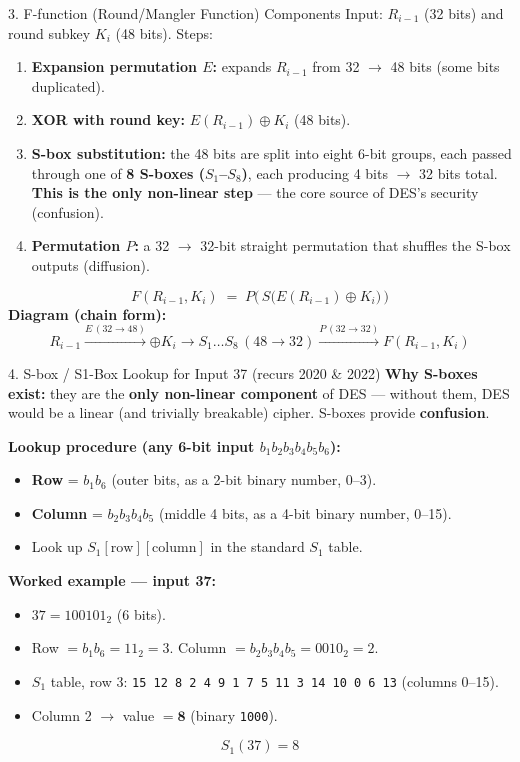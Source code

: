\documentclass[12pt,a4paper]{article}
\begin{document}
\begin{algobox}{3. F-function (Round/Mangler Function) Components}
Input: $R_{i-1}$ (32 bits) and round subkey $K_i$ (48 bits). Steps:
\begin{enumerate}[noitemsep]
  \item \textbf{Expansion permutation $E$:} expands $R_{i-1}$ from 32 $\to$ 48 bits (some bits duplicated).
  \item \textbf{XOR with round key:} $E(R_{i-1}) \oplus K_i$ (48 bits).
  \item \textbf{S-box substitution:} the 48 bits are split into eight 6-bit groups, each passed through one of \textbf{8 S-boxes ($S_1$--$S_8$)}, each producing 4 bits $\to$ 32 bits total. \textbf{This is the only non-linear step} --- the core source of DES's security (confusion).
  \item \textbf{Permutation $P$:} a 32 $\to$ 32-bit straight permutation that shuffles the S-box outputs (diffusion).
\end{enumerate}
\[
F(R_{i-1},K_i) \;=\; P\Big(\, S\big(E(R_{i-1}) \oplus K_i\big) \,\Big)
\]
\textbf{Diagram (chain form):}
\[
R_{i-1} \xrightarrow{E\,(32\to48)} \boxed{\oplus K_i} \xrightarrow{} \boxed{S_1\dots S_8\,(48\to32)} \xrightarrow{P\,(32\to32)} F(R_{i-1},K_i)
\]
\end{algobox}

\begin{algobox}{4. S-box / S1-Box Lookup for Input 37 (recurs 2020 \& 2022)}
\textbf{Why S-boxes exist:} they are the \textbf{only non-linear component} of DES --- without them, DES would be a linear (and trivially breakable) cipher. S-boxes provide \textbf{confusion}.

\textbf{Lookup procedure (any 6-bit input $b_1b_2b_3b_4b_5b_6$):}
\begin{itemize}[noitemsep]
  \item \textbf{Row} = $b_1b_6$ (outer bits, as a 2-bit binary number, 0--3).
  \item \textbf{Column} = $b_2b_3b_4b_5$ (middle 4 bits, as a 4-bit binary number, 0--15).
  \item Look up $S_1[\text{row}][\text{column}]$ in the standard $S_1$ table.
\end{itemize}

\textbf{Worked example --- input 37:}
\begin{itemize}[noitemsep]
  \item $37 = 100101_2$ (6 bits).
  \item Row $= b_1b_6 = 11_2 = 3$. Column $= b_2b_3b_4b_5 = 0010_2 = 2$.
  \item $S_1$ table, row 3: \texttt{15 12 8 2 4 9 1 7 5 11 3 14 10 0 6 13} (columns 0--15).
  \item Column 2 $\to$ value $= \mathbf{8}$ (binary \texttt{1000}).
\end{itemize}
\[
\boxed{S_1(37) = 8}
\]
\end{algobox}
\end{document}
